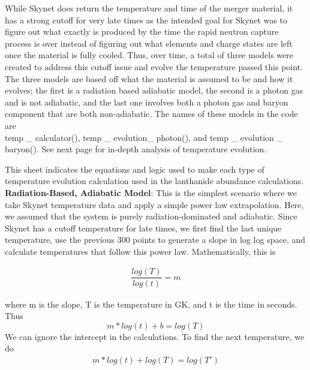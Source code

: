 \documentclass[11pt,a4paper]{article}
\begin{document}
While Skynet does return the temperature and time of the merger material, it has a strong cutoff for very late times as the intended goal for Skynet was to figure out what exactly is produced by the time the rapid neutron capture process is over instead of figuring out what elements and charge states are left once the material is fully cooled. Thus, over time, a total of three models were created to address this cutoff issue and evolve the temperature passed this point. The three models are based off what the material is assumed to be and how it evolves; the first is a radiation based adiabatic model, the second is a photon gas and is not adiabatic, and the last one involves both a photon gas and baryon component that are both non-adiabatic. The names of these models in the code are \\ temp \_ calculator(),  temp \_ evolution\_ photon(), and temp \_ evolution \_ baryon(). See next page for in-depth analysis of temperature evolution. 

\pagebreak







\maketitle   This sheet indicates the equations and logic used to make each type of temperature evolution calculation used in the lanthanide abundance calculations. \\

\textbf{Radiation-Based, Adiabatic Model}: This is the simplest scenario where we take Skynet temperature data and apply a simple power law extrapolation. Here, we assumed that the system is purely radiation-dominated and adiabatic. Since Skynet has a cutoff temperature for late times, we first find the last unique temperature, use the previous 300 points to generate a slope in log log space, and calculate temperatures that follow this power law. Mathematically, this is 

\begin{align}
	\dfrac{log(T)}{log(t)} = m 
\end{align}

 where m is the slope, T is the temperature in GK, and t is the time in seconds. Thus
$$ m*log(t) + b = log(T) $$ We can ignore the intercept in the calculations. To find the next temperature, we do
\begin{align}
	m*log(t) + log(T) = log(T')
\end{align}
\end{document}
